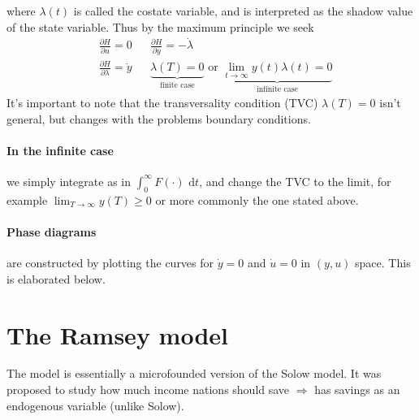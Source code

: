\documentclass[12pt, a4paper]{article}
\begin{document}
\begin{spacing}{1.213}
\begin{equation}
\end{equation}
where $\lambda(t)$ is called the costate variable, and is interpreted as the shadow value of the state variable. Thus by the maximum principle we seek
\begin{align*}
&\frac{\partial H}{\partial u} = 0 && \frac{\partial H}{\partial y} = - \dot{\lambda} \\
& \frac{\partial H}{\partial \lambda} = \dot{y} && \underbrace{\lambda(T) = 0}_{\textrm{finite case}} \textrm{ or } \underbrace{\lim_{t\rightarrow \infty} y(t)\lambda(t) = 0}_{\textrm{infinite case}}
\end{align*}
It's important to note that the transversality condition (TVC) $\lambda(T)= 0 $ isn't general, but changes with the problems boundary conditions.

\paragraph{In the infinite case} we simply integrate as in $\int_0^{\infty} F(\cdot) \textrm{ d}t$, and change the TVC to the limit, for example $\lim_{T \rightarrow \infty} y(T) \geq 0$ or more commonly the one stated above.

\paragraph{Phase diagrams} are constructed by plotting the curves for $\dot{y}= 0 $ and $ \dot{u} = 0 $ in $(y,u)$ space. This is elaborated below.

\section{The Ramsey model}
The model is essentially a microfounded version of the Solow model. It was proposed to study how much income nations should save $\Rightarrow$ has savings as an endogenous variable (unlike Solow).



\end{spacing}
\end{document}
